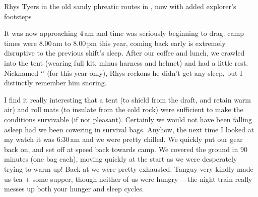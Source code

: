 \begin{marginfigure}
\checkoddpage \ifoddpage \forcerectofloat \else \forceversofloat \fi
\centering
 \caption{Rhys Tyers in the old sandy phreatic routes in , now with added explorer's footsteps }
 \label{potato formations}
\end{marginfigure}

It was now approaching 4\,am and time was seriously beginning to drag.  camp times were 8.00\,am to 8.00\,pm this year, coming back early is extremely disruptive to the previous shift's sleep. After our coffee and lunch, we crawled into the tent (wearing full kit, minus harness and helmet) and had a little rest. Nicknamed `' (for this year only), Rhys reckons he didn't get any sleep, but I distinctly remember him snoring.

I find it really interesting that a tent (to shield from the draft, and retain warm air) and roll mats (to insulate from the cold rock) were sufficient to make the conditions survivable (if not pleasant). Certainly we would not have been falling asleep had we been cowering in survival bags.
Anyhow, the next time I looked at my watch it was 6:30\,am and we were pretty chilled. We quickly put our gear back on, and set off at speed back towards camp. We covered the ground in 90 minutes (one bag each), moving quickly at the start as we were desperately trying to warm up!
Back at  we were pretty exhausted. Tanguy very kindly made us tea + some supper, though neither of us were hungry ---the night train really messes up both your hunger and sleep cycles.

